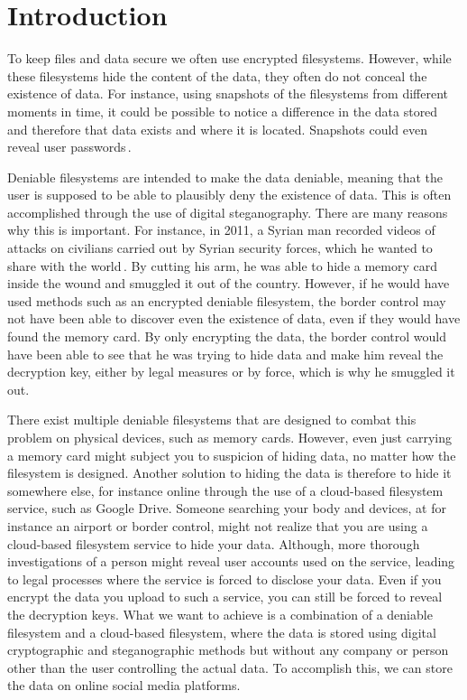 
\chapter{Introduction}
\label{ch:introduction}

To keep files and data secure we often use encrypted filesystems. However, while these filesystems hide the content of the data, they often do not conceal the existence of data. For instance, using snapshots of the filesystems from different moments in time, it could be possible to notice a difference in the data stored and therefore that data exists and where it is located. Snapshots could even reveal user passwords\,\cite{hanMultiuserSteganographicFile2010}.

Deniable filesystems are intended to make the data deniable, meaning that the user is supposed to be able to plausibly deny the existence of data. This is often accomplished through the use of digital steganography. There are many reasons why this is important. For instance, in 2011, a Syrian man recorded videos of attacks on civilians carried out by Syrian security forces, which he wanted to share with the world\,\cite{westheadHowSyrianRefugee2012}. By cutting his arm, he was able to hide a memory card inside the wound and smuggled it out of the country. However, if he would have used methods such as an encrypted deniable filesystem, the border control may not have been able to discover even the existence of data, even if they would have found the memory card. By only encrypting the data, the border control would have been able to see that he was trying to hide data and make him reveal the decryption key, either by legal measures or by force, which is why he smuggled it out.

There exist multiple deniable filesystems that are designed to combat this problem on physical devices, such as memory cards. However, even just carrying a memory card might subject you to suspicion of hiding data, no matter how the filesystem is designed. Another solution to hiding the data is therefore to hide it somewhere else, for instance online through the use of a cloud-based filesystem service, such as Google Drive. Someone searching your body and devices, at for instance an airport or border control, might not realize that you are using a cloud-based filesystem service to hide your data. Although, more thorough investigations of a person might reveal user accounts used on the service, leading to legal processes where the service is forced to disclose your data. Even if you encrypt the data you upload to such a service, you can still be forced to reveal the decryption keys. What we want to achieve is a combination of a deniable filesystem and a cloud-based filesystem, where the data is stored using digital cryptographic and steganographic methods but without any company or person other than the user controlling the actual data. To accomplish this, we can store the data on online social media platforms.

